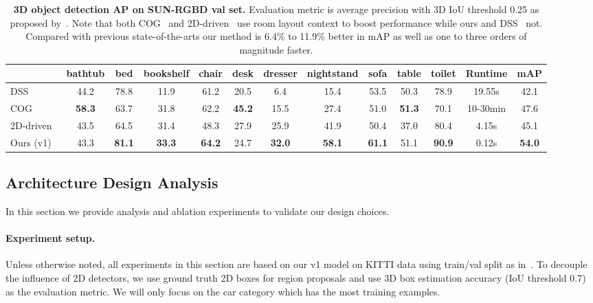 \begin{table}[t!]
\small
\centering
\begin{tabular}{l|cccccccccc|c|c}
\hline
          & bathtub & bed & bookshelf & chair & desk & dresser & nightstand & sofa & table & toilet & Runtime  & mAP \\ \hline
DSS~\cite{song2016deep} & 44.2 & 78.8 & 11.9 & 61.2 & 20.5 & 6.4 & 15.4 & 53.5 & 50.3 & 78.9 & 19.55s   & 42.1    \\
COG~\cite{ren2016three} & \textbf{58.3} & 63.7 & 31.8 & 62.2 & \textbf{45.2} & 15.5 & 27.4 & 51.0 & \textbf{51.3} & 70.1 & 10-30min & 47.6 \\
2D-driven~\cite{lahoud20172d} & 43.5 & 64.5 & 31.4 & 48.3 & 27.9 & 25.9 & 41.9 & 50.4 & 37.0 & 80.4 & 4.15s    & 45.1  \\ \hline
Ours (v1) & 43.3 & \textbf{81.1} & \textbf{33.3} & \textbf{64.2} & 24.7 & \textbf{32.0} & \textbf{58.1} & \textbf{61.1} & 51.1 & \textbf{90.9} & 0.12s & \textbf{54.0} \\ \hline
\end{tabular}
\caption{\textbf{3D object detection AP on SUN-RGBD val set.} Evaluation metric is average precision with 3D IoU threshold 0.25 as proposed by~\cite{song2015sun}. Note that both COG~\cite{ren2016three} and 2D-driven~\cite{lahoud20172d} use room layout context to boost performance while ours and DSS~\cite{song2016deep} not. Compared with previous state-of-the-arts our method is 6.4\% to 11.9\% better in mAP as well as one to three orders of magnitude faster.}
\label{tab:sunrgbd}
\end{table}


\subsection{Architecture Design Analysis} \label{sec:exp_analysis}
In this section we provide analysis and ablation experiments to validate our design choices.

\paragraph{Experiment setup.} Unless otherwise noted, all experiments in this section are based on our v1 model on KITTI data using train/val split as in~\cite{cvpr17chen}. To decouple the influence of 2D detectors, we use ground truth 2D boxes for region proposals and use 3D box estimation accuracy (IoU threshold 0.7) as the evaluation metric. We will only focus on the car category which has the most training examples.

